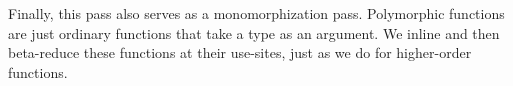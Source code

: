 \documentclass[acmsmall,screen,nonacm]{acmart}
\newcommand{\tsc}[1]{\textsc{#1}}
\begin{document}


Finally, this pass also serves as a
monomorphization pass. Polymorphic functions are just ordinary functions that
take a type as an argument. We inline and then beta-reduce these functions at
their use-sites, just as we do for higher-order functions.

\end{document}
